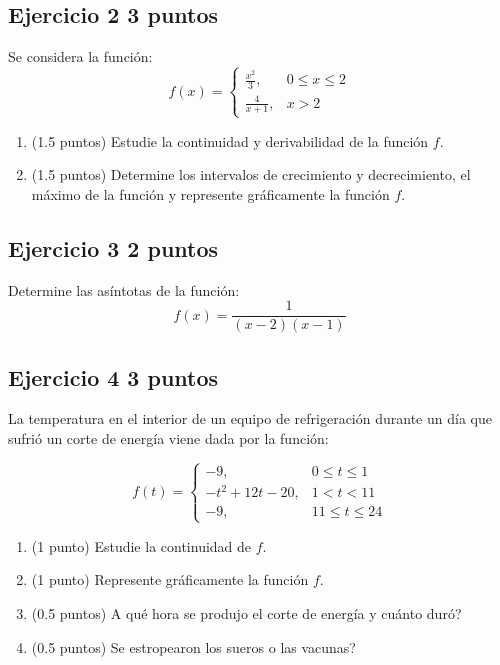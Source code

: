 \documentclass[11pt]{article}
\begin{document}
\subsection*{Ejercicio 2 \hfill 3 puntos} Se considera la función:
\[
f(x) =
\begin{cases} 
\frac{x^2}{3}, & 0 \leq x \leq 2 \\
\frac{4}{x+1}, & x > 2
\end{cases}
\]

\begin{enumerate}[label=(\alph*)]
\item (1.5 puntos) Estudie la continuidad y derivabilidad de la función \(f\).



\item (1.5 puntos) Determine los intervalos de crecimiento y decrecimiento, el máximo de la función y represente gráficamente la función \(f\).


\end{enumerate}

\clearpage
\subsection*{Ejercicio 3 \hfill 2 puntos} Determine las asíntotas de la función:
\[
f(x) = \frac{1}{(x-2)(x-1)}
\]



\subsection*{Ejercicio 4 \hfill 3 puntos} La temperatura en el interior de un equipo de refrigeración durante un día que sufrió un corte de energía viene dada por la función:

\[
f(t) =
\begin{cases} 
-9, & 0 \leq t \leq 1 \\
-t^2 + 12t - 20, & 1 < t < 11 \\
-9, & 11 \leq t \leq 24
\end{cases}
\]

\begin{enumerate}[label=(\alph*)]
\item (1 punto) Estudie la continuidad de \(f\).



\item (1 punto) Represente gráficamente la función \(f\).



\item (0.5 puntos) \textquestiondown{}A qué hora se produjo el corte de energía y cuánto duró?



\item (0.5 puntos) \textquestiondown{}Se estropearon los sueros o las vacunas?


\end{enumerate}
\end{document}
